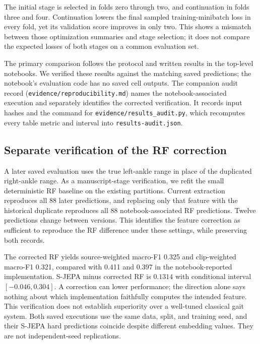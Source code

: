 \documentclass[10pt,twocolumn,letterpaper]{article}
\begin{document}
The initial stage is selected in folds zero through two, and continuation in folds three and four. Continuation lowers the final sampled training-minibatch loss in every fold, yet its validation score improves in only two. This shows a mismatch between those optimization summaries and stage selection; it does not compare the expected losses of both stages on a common evaluation set.

The primary comparison follows the protocol and written results in the top-level notebooks. We verified these results against the matching saved predictions; the notebook's evaluation code has no saved cell outputs. The companion audit record (\texttt{evidence/reproducibility.md}) names the notebook-associated execution and separately identifies the corrected verification. It records input hashes and the command for \texttt{evidence/results\_audit.py}, which recomputes every table metric and interval into \texttt{results-audit.json}.

\subsection{Separate verification of the RF correction}
A later saved evaluation uses the true left-ankle range in place of the duplicated right-ankle range. As a manuscript-stage verification, we refit the small deterministic RF baseline on the existing partitions. Current extraction reproduces all 88 later predictions, and replacing only that feature with the historical duplicate reproduces all 88 notebook-associated RF predictions. Twelve predictions change between versions. This identifies the feature correction as sufficient to reproduce the RF difference under these settings, while preserving both records.

The corrected RF yields source-weighted macro-F1 0.325 and clip-weighted macro-F1 0.321, compared with 0.411 and 0.397 in the notebook-reported implementation. S-JEPA minus corrected RF is $0.1314$ with conditional interval $[-0.046,0.304]$. A correction can lower performance; the direction alone says nothing about which implementation faithfully computes the intended feature. This verification does not establish superiority over a well-tuned classical gait system. Both saved executions use the same data, split, and training seed, and their S-JEPA hard predictions coincide despite different embedding values. They are not independent-seed replications.
\end{document}
